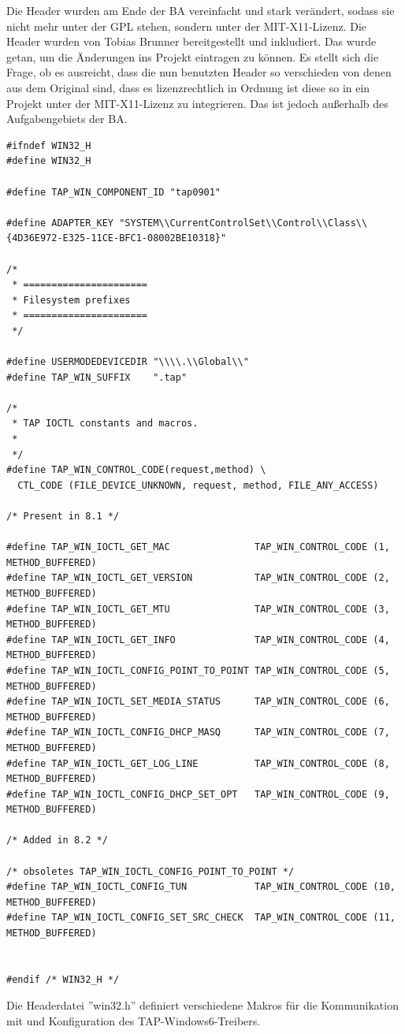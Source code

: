 Die Header wurden am Ende der \ac{BA} vereinfacht und stark verändert, sodass sie nicht mehr unter der GPL stehen,
sondern unter der MIT-X11-Lizenz. Die Header wurden von Tobias Brunner bereitgestellt und inkludiert.
Das wurde getan, um die Änderungen ins Projekt eintragen zu können.
Es stellt sich die Frage, ob es ausreicht, dass die nun benutzten Header so verschieden von
denen aus dem Original sind, dass es lizenzrechtlich in Ordnung ist diese so in ein
Projekt unter der MIT-X11-Lizenz zu integrieren. Das ist jedoch außerhalb des Aufgabengebiets
der \ac{BA}.

\begin{lstlisting}[caption=win32.h-Headerdatei für den TAP-Windows6-Treiber,label=win32.h]
#ifndef WIN32_H
#define WIN32_H

#define TAP_WIN_COMPONENT_ID "tap0901"

#define ADAPTER_KEY "SYSTEM\\CurrentControlSet\\Control\\Class\\{4D36E972-E325-11CE-BFC1-08002BE10318}"

/*
 * ======================
 * Filesystem prefixes
 * ======================
 */

#define USERMODEDEVICEDIR "\\\\.\\Global\\"
#define TAP_WIN_SUFFIX    ".tap"

/*
 * TAP IOCTL constants and macros.
 *
 */
#define TAP_WIN_CONTROL_CODE(request,method) \
  CTL_CODE (FILE_DEVICE_UNKNOWN, request, method, FILE_ANY_ACCESS)

/* Present in 8.1 */

#define TAP_WIN_IOCTL_GET_MAC               TAP_WIN_CONTROL_CODE (1, METHOD_BUFFERED)
#define TAP_WIN_IOCTL_GET_VERSION           TAP_WIN_CONTROL_CODE (2, METHOD_BUFFERED)
#define TAP_WIN_IOCTL_GET_MTU               TAP_WIN_CONTROL_CODE (3, METHOD_BUFFERED)
#define TAP_WIN_IOCTL_GET_INFO              TAP_WIN_CONTROL_CODE (4, METHOD_BUFFERED)
#define TAP_WIN_IOCTL_CONFIG_POINT_TO_POINT TAP_WIN_CONTROL_CODE (5, METHOD_BUFFERED)
#define TAP_WIN_IOCTL_SET_MEDIA_STATUS      TAP_WIN_CONTROL_CODE (6, METHOD_BUFFERED)
#define TAP_WIN_IOCTL_CONFIG_DHCP_MASQ      TAP_WIN_CONTROL_CODE (7, METHOD_BUFFERED)
#define TAP_WIN_IOCTL_GET_LOG_LINE          TAP_WIN_CONTROL_CODE (8, METHOD_BUFFERED)
#define TAP_WIN_IOCTL_CONFIG_DHCP_SET_OPT   TAP_WIN_CONTROL_CODE (9, METHOD_BUFFERED)

/* Added in 8.2 */

/* obsoletes TAP_WIN_IOCTL_CONFIG_POINT_TO_POINT */
#define TAP_WIN_IOCTL_CONFIG_TUN            TAP_WIN_CONTROL_CODE (10, METHOD_BUFFERED)
#define TAP_WIN_IOCTL_CONFIG_SET_SRC_CHECK  TAP_WIN_CONTROL_CODE (11, METHOD_BUFFERED)


#endif /* WIN32_H */
\end{lstlisting}
Die Headerdatei ''win32.h'' definiert verschiedene Makros für die Kommunikation mit und Konfiguration
des TAP-Windows6-Treibers.

